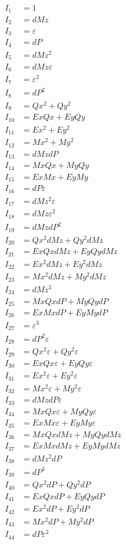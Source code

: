 \documentclass{article}
\begin{document}
\begin{align*}
I_{1} &= 1 \\
I_{2} &= dMz \\
I_{3} &= ε \\
I_{4} &= dP \\
I_{5} &= dMz^{2} \\
I_{6} &= dMz ε \\
I_{7} &= ε^{2} \\
I_{8} &= dP^{2} \\
I_{9} &= Qx^{2} + Qy^{2} \\
I_{10} &= Ex Qx + Ey Qy \\
I_{11} &= Ex^{2} + Ey^{2} \\
I_{12} &= Mx^{2} + My^{2} \\
I_{13} &= dMz dP \\
I_{14} &= Mx Qx + My Qy \\
I_{15} &= Ex Mx + Ey My \\
I_{16} &= dP ε \\
I_{17} &= dMz^{2} ε \\
I_{18} &= dMz ε^{2} \\
I_{19} &= dMz dP^{2} \\
I_{20} &= Qx^{2} dMz + Qy^{2} dMz \\
I_{21} &= Ex Qx dMz + Ey Qy dMz \\
I_{22} &= Ex^{2} dMz + Ey^{2} dMz \\
I_{23} &= Mx^{2} dMz + My^{2} dMz \\
I_{24} &= dMz^{3} \\
I_{25} &= Mx Qx dP + My Qy dP \\
I_{26} &= Ex Mx dP + Ey My dP \\
I_{27} &= ε^{3} \\
I_{28} &= dP^{2} ε \\
I_{29} &= Qx^{2} ε + Qy^{2} ε \\
I_{30} &= Ex Qx ε + Ey Qy ε \\
I_{31} &= Ex^{2} ε + Ey^{2} ε \\
I_{32} &= Mx^{2} ε + My^{2} ε \\
I_{33} &= dMz dP ε \\
I_{34} &= Mx Qx ε + My Qy ε \\
I_{35} &= Ex Mx ε + Ey My ε \\
I_{36} &= Mx Qx dMz + My Qy dMz \\
I_{37} &= Ex Mx dMz + Ey My dMz \\
I_{38} &= dMz^{2} dP \\
I_{39} &= dP^{3} \\
I_{40} &= Qx^{2} dP + Qy^{2} dP \\
I_{41} &= Ex Qx dP + Ey Qy dP \\
I_{42} &= Ex^{2} dP + Ey^{2} dP \\
I_{43} &= Mx^{2} dP + My^{2} dP \\
I_{44} &= dP ε^{2} \\
\end{align*}
\end{document}
